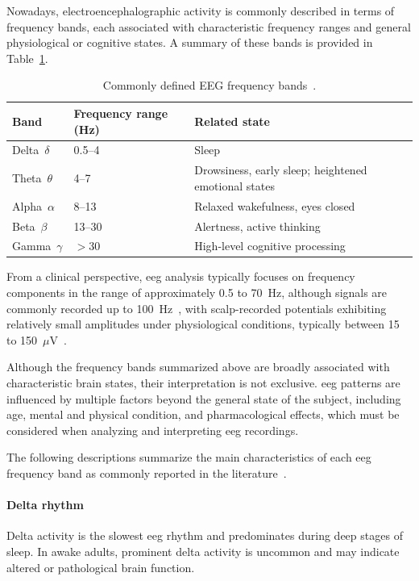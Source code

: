 Nowadays, electroencephalographic activity is commonly described in terms of frequency bands, each associated with characteristic frequency ranges and general physiological or cognitive states. A summary of these bands is provided in Table~\ref{tab:eeg_frequency_bands}.

\begin{table}[htbp]
\centering
\caption[Commonly defined EEG frequency bands.]{Commonly defined EEG frequency bands~\cite{nayak-2025}.}
\label{tab:eeg_frequency_bands}
\begin{tabular}{lll}
\hline
\textbf{Band} & \textbf{Frequency range (Hz)} & \textbf{Related state} \\
\hline
Delta~$\delta$  & 0.5--4   & Sleep \\
Theta~$\theta$  & 4--7     & Drowsiness, early sleep; heightened emotional states \\
Alpha~$\alpha$  & 8--13    & Relaxed wakefulness, eyes closed \\
Beta~$\beta$    & 13--30   & Alertness, active thinking \\
Gamma~$\gamma$  & $>$30    & High-level cognitive processing \\
\hline
\end{tabular}
\end{table}

From a clinical perspective, \gls{eeg} analysis typically focuses on frequency components in the range of approximately 0.5 to 70~Hz, although signals are commonly
recorded up to 100~Hz~\cite{kong-2025}, with scalp-recorded potentials exhibiting relatively small amplitudes under physiological conditions, typically between 15 to 150~$\mu$V~\cite{Naydenov2022}.

Although the frequency bands summarized above are broadly associated with characteristic brain states, their interpretation is not exclusive. \gls{eeg} patterns are
influenced by multiple factors beyond the general state of the subject, including age, mental and physical condition, and pharmacological effects, which must be
considered when analyzing and interpreting \gls{eeg} recordings.

The following descriptions summarize the main characteristics of each \gls{eeg} frequency band as commonly reported in the literature~\cite{nayak-2025}.

\paragraph*{Delta rhythm}
Delta activity is the slowest \gls{eeg} rhythm and predominates during deep stages of sleep. In awake adults, prominent delta activity is uncommon and may indicate altered or pathological brain function.

